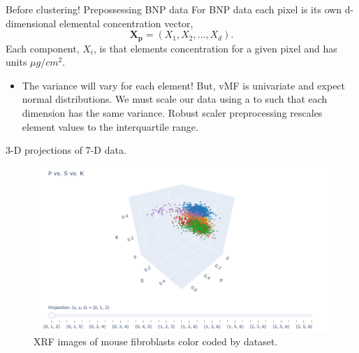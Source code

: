 \documentclass[
]{beamer}
\begin{document}
\begin{frame}{Before clustering! Prepossessing BNP data}
For BNP data each pixel is its own d-dimensional elemental concentration vector, 
$$\boldsymbol{X_p} = (X_1, X_2, ..., X_d).$$
Each component, $X_i$, is that elements concentration for a given pixel and has units $\mu g/cm^2$. 

\begin{itemize}
    \item The variance will vary for each element! But, vMF is univariate and expect normal distributions. We must scale our data using a to such that each dimension has the same variance. Robust scaler preprocessing rescales element values to the interquartile range.
\end{itemize}
    
\end{frame}

\begin{frame}{3-D projections of 7-D data.}
\begin{figure}[h]
  \includegraphics[width=1\textwidth,height=1\textheight,keepaspectratio]{7dto3d.png}
  \caption{XRF images of mouse fibroblasts color coded by dataset.}
\end{figure}
\end{frame}
\end{document}
